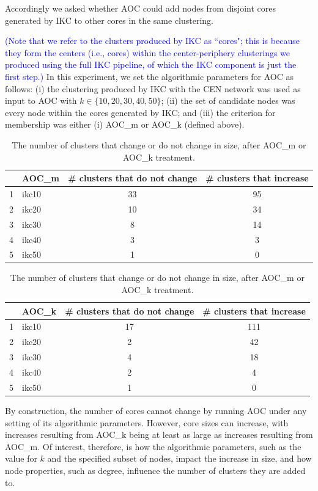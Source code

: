 \documentclass[12pt, oneside]{article}   	%
\begin{document}
Accordingly we asked whether AOC could add nodes from disjoint cores generated by IKC to other cores in the same clustering. {\textcolor{blue}{(Note that we refer to the clusters produced by IKC as ``cores"; this is because they form the centers (i.e., cores) within the center-periphery clusterings we produced using the full IKC pipeline, of which the IKC component is just the first step.)}
In this experiment,  we set the algorithmic parameters for AOC as follows: (i) the clustering produced by IKC with the CEN network was used as input to AOC with $k \in \{10, 20, 30, 40, 50\}$; (ii) the set of candidate nodes was every node within the cores generated by IKC; and (iii) the criterion for membership was either (i) AOC\_m or AOC\_k (defined above).

\begin{table}[H]
\centering
\begin{tabular}{rlcc}
\hline
& AOC\_m & \# clusters that do not change & \# clusters that increase\\ 
\hline
1 & ikc10 &  33 &  95 \\ 
2 & ikc20 &  10 &  34 \\ 
3 & ikc30 &   8 &  14 \\ 
4 & ikc40 &   3 &   3 \\ 
5 & ikc50 &   1 &   0 \\ 
\hline
\end{tabular}
\quad
\begin{tabular}{rlcc}
\hline
& AOC\_k& \# clusters that do not change & \# clusters that increase \\ 
\hline
1 & ikc10 &  17 & 111 \\ 
2 & ikc20 &   2 &  42 \\ 
3 & ikc30 &   4 &  18 \\ 
4 & ikc40 &   2 &   4 \\ 
5 & ikc50 &   1 &   0 \\ 
\hline
\end{tabular}
\caption{The number of clusters that change or do not change in size, after AOC\_m or AOC\_k treatment.}
\label{tab:tab-change-no-change}
\end{table}


By construction, the number of cores cannot change by running AOC  under any setting of its algorithmic parameters. However, core sizes can increase, with increases resulting from AOC\_k being at least as large as increases resulting from AOC\_m. Of interest, therefore, is how the algorithmic parameters, such as the value for $k$ and the specified subset of nodes, impact the increase in size, and how node properties, such as degree, influence the number of clusters they are added to.
	
}
\end{document}
